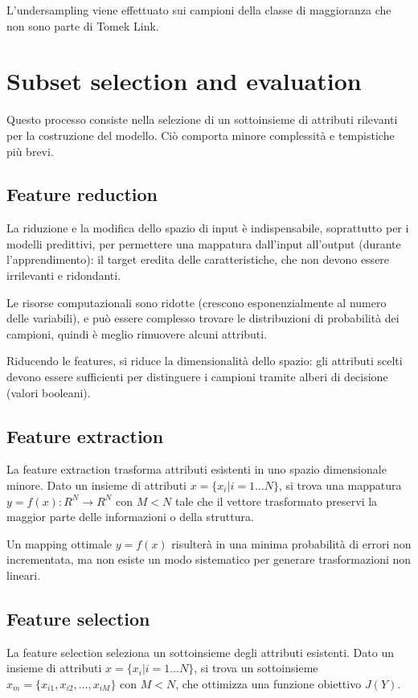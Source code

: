 L'undersampling viene effettuato sui campioni della classe di maggioranza che non sono parte di Tomek Link. 

\section{Subset selection and evaluation}
Questo processo consiste nella selezione di un sottoinsieme di attributi 
rilevanti per la costruzione del modello. Ciò comporta minore complessità e 
tempistiche più brevi.

\subsection{Feature reduction}
La riduzione e la modifica dello spazio di input è indispensabile, soprattutto per i modelli predittivi, per permettere una mappatura dall'input all'output (durante l'apprendimento): il target eredita delle caratteristiche, che non devono essere irrilevanti e ridondanti.

Le risorse computazionali sono ridotte (crescono esponenzialmente al numero delle variabili), e può essere complesso trovare le distribuzioni di probabilità dei campioni, quindi è meglio rimuovere alcuni attributi.

Riducendo le features, si riduce la dimensionalità dello spazio: gli attributi scelti devono essere sufficienti per distinguere i campioni tramite alberi di decisione (valori booleani). 

\subsection{Feature extraction}
La feature extraction trasforma attributi esistenti in uno spazio 
dimensionale minore. Dato un insieme di attributi $x = \{x_i | i = 1 \dots 
N\}$, si trova una mappatura $y = f(x) : R^N \rightarrow R^N$ con $M < N$ 
tale che il vettore trasformato preservi la maggior parte delle informazioni o 
della struttura.

Un mapping ottimale $y = f(x)$ risulterà in una minima probabilità di errori non incrementata, ma non esiste un modo sistematico per generare trasformazioni non lineari. 

\subsection{Feature selection}
La feature selection seleziona un sottoinsieme degli attributi esistenti. Dato un insieme di attributi $x = \{x_i | i = 1 \dots N\}$, si trova un sottoinsieme $x_m = \{x_{i1}, x_{i2}, \dots, x_{iM}\}$ con $M < N$, che ottimizza una funzione obiettivo $J(Y)$.

